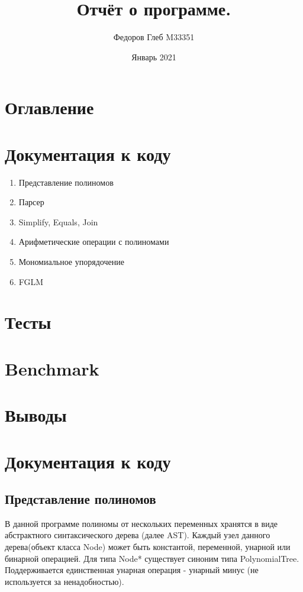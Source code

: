 \documentclass{article}
\title{Отчёт о программе.}
\author{Федоров Глеб M33351}
\date{Январь 2021}
\begin{document}
\begin{titlepage}
    \maketitle
\end{titlepage}

\section*{Оглавление}

\section{Документация к коду}

\begin{enumerate}
    \item {Представление полиномов}  
    \item {Парсер}
    \item {Simplify, Equals, Join}
    \item {Арифметические операции с полиномами}
    \item {Мономиальное упорядочение}
    \item {FGLM}
\end{enumerate}
\section{Тесты}
\section{Benchmark}
\section{Выводы}

\newpage
\setcounter{section}{0}
\section{Документация к коду}
\subsection{Представление полиномов}
В данной программе полиномы от нескольких переменных хранятся в виде
 абстрактного синтаксического
дерева (далее AST). Каждый узел данного дерева(объект класса Node) может быть константой, 
переменной, унарной или бинарной операцией.
Для типа Node* существует синоним типа PolynomialTree.
Поддерживается единственная унарная операция - унарный минус (не используется за ненадобностью).
\end{document}
